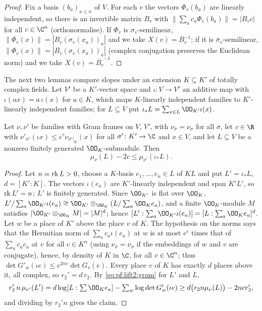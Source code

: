 \begin{proof}
Fix a basis $(b_a)_{a\le n}$ of $V$. For each $v$ the vectors $\Phi_v(b_a)$ are linearly independent, so
there is an invertible matrix $B_v$ with $\|\sum_ac_a\Phi_v(b_a)\|=|B_vc|$ for all $c\in\C^n$ (orthonormalise).
If $\Phi_v$ is $\sigma_v$-semilinear, $\|\Phi_v(x)\|=|B_v(\sigma_v(x_a))_a|$ and we take $X(v)=B_v^{-1}$; if it is
$\bar\sigma_v$-semilinear, $\|\Phi_v(x)\|=|\overline{B_v}(\sigma_v(x_a))_a|$ (complex conjugation preserves the
Euclidean norm) and we take $X(v)=\overline{B_v}^{-1}$.
\end{proof}

The next two lemmas compare slopes under an extension $K\subseteq K'$ of totally complex fields. Let $V'$ be a
$K'$-vector space and $\iota\colon V\to V'$ an additive map with $\iota(ax)=a\,\iota(x)$ for $a\in K$, which maps
$K$-linearly independent families to $K'$-linearly independent families; for $L\subseteq V$ put
$\iota_*L=\sum_{x\in L}\OO_{K'}\iota(x)$.

\begin{lemma}\label{pf:lift2:slopeext}
Let $\nu,\nu'$ be families with Gram frames on $V$, $V'$, with $\nu_{\bar\sigma}=\nu_\sigma$ for all $\sigma$, let
$c\in\R$ with $\nu'_{\sigma'}(\iota x)\le e^c\nu_{\sigma'|_K}(x)$ for all $\sigma'\colon K'\to\C$ and $x\in V$,
and let $L\subseteq V$ be a nonzero finitely generated $\OO_K$-submodule. Then
\[
\mu_\nu(L)-2c\le\mu_{\nu'}(\iota_*L).
\]
\end{lemma}

\begin{proof}
Let $n=\operatorname{rk} L>0$, choose a $K$-basis $e_1,\dots,e_n\in L$ of $KL$ and put $L'=\iota_*L$, $d=[K':K]$. The
vectors $\iota(e_a)$ are $K'$-linearly independent and span $K'L'$, so $\operatorname{rk} L'=n$; $L'$ is finitely
generated. Since $\OO_{K'}$ is flat over $\OO_K$, $L'/\sum_a\OO_{K'}\iota(e_a)\cong\OO_{K'}\otimes_{\OO_K}
(L/\sum_a\OO_Ke_a)$, and a finite $\OO_K$-module $M$ satisfies $|\OO_{K'}\otimes_{\OO_K}M|=|M|^d$; hence
$[L':\sum_a\OO_{K'}\iota(e_a)]=[L:\sum_a\OO_Ke_a]^d$. Let $w$ be a place of $K'$ above the place $v$ of $K$. The
hypothesis on the norms says that the Hermitian norm of $\sum_ac_a\iota(e_a)$ at $w$ is at most $e^c$ times
that of $\sum_ac_ae_a$ at $v$ for all $c\in K^n$ (using $\nu_{\bar\sigma}=\nu_\sigma$ if the embeddings of $w$
and $v$ are conjugate), hence, by density of $K$ in $\C$, for all $c\in\C^n$; thus $\det G'_w(\iota e)\le
e^{2nc}\det G_v(e)$. Every place $v$ of $K$ has exactly $d$ places above it, all complex, so $r_2'=d\,r_2$.
By \eqref{eq:pf:lift2:gram} for $L'$ and $L$,
\[
r_2'\,n\,\mu_{\nu'}(L')=d\log[L:\textstyle\sum\OO_Ke_a]-\sum_w\log\det G'_w(\iota e)
\ge d\bigl(r_2n\mu_\nu(L)\bigr)-2ncr_2',
\]
and dividing by $r_2'n$ gives the claim.
\end{proof}

